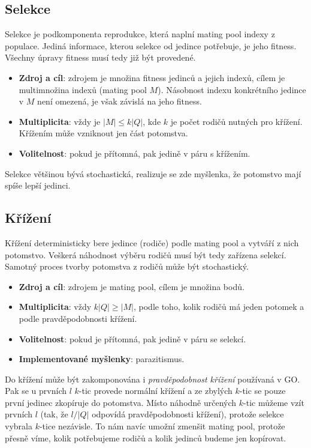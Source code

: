 \subsection{Selekce}

Selekce je podkomponenta reprodukce, která naplní mating pool indexy z populace. Jediná informace, kterou selekce od jedince potřebuje, je jeho fitness. Všechny úpravy fitness musí tedy již být provedené.

\begin{itemize}
  \item \textbf{Zdroj a cíl}: zdrojem je množina fitness jedinců a jejich indexů, cílem je multimnožina indexů (mating pool $M$). Násobnost indexu konkrétního jedince v $M$ není omezená, je však závislá na jeho fitness.
  \item \textbf{Multiplicita}: vždy je $|M| \leq k|Q|$, kde $k$ je počet rodičů nutných pro křížení. Křížením může vzniknout jen část potomstva.
  \item \textbf{Volitelnost}: pokud je přítomná, pak jedině v páru s křížením.
\end{itemize}

Selekce většinou bývá stochastická, realizuje se zde myšlenka, že potomstvo mají spíše lepší jedinci.

\subsection{Křížení}

Křížení deterministicky bere jedince (rodiče) podle mating pool a vytváří z nich potomstvo. Veškerá náhodnost výběru rodičů musí být tedy zařízena selekcí. Samotný proces tvorby potomstva z rodičů může být stochastický.

\begin{itemize}
  \item \textbf{Zdroj a cíl}: zdrojem je mating pool, cílem je množina bodů.
  \item \textbf{Multiplicita}: vždy $k|Q| \geq |M|$, podle toho, kolik rodičů má jeden potomek a podle pravděpodobnosti křížení.
  \item \textbf{Volitelnost}: pokud je přítomná, pak jedině v páru se selekcí.
  \item \textbf{Implementované myšlenky}: parazitismus.
\end{itemize}

Do křížení může být zakomponována i \emph{pravděpodobnost křížení} používaná v GO. Pak se u prvních $l$ $k$-tic provede normální křížení a ze zbylých $k$-tic se pouze první jedinec zkopíruje do potomstva. Místo náhodně určených $k$-tic můžeme vzít prvních $l$ (tak, že $l/|Q|$ odpovídá pravděpodobnosti křížení), protože selekce vybrala $k$-tice nezávisle. To nám navíc umožní zmenšit mating pool, protože přesně víme, kolik potřebujeme rodičů a kolik jedinců budeme jen kopírovat.

